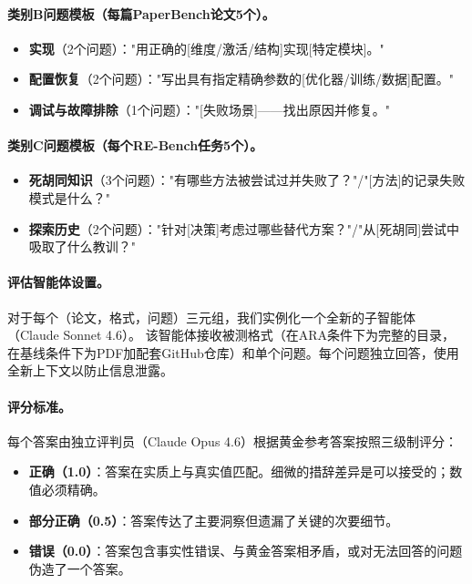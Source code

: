\paragraph{类别B问题模板（每篇PaperBench论文5个）。}
\begin{itemize}[leftmargin=*, itemsep=2pt]
    \item \textbf{实现}（2个问题）："用正确的[维度/激活/结构]实现[特定模块]。"
    \item \textbf{配置恢复}（2个问题）："写出具有指定精确参数的[优化器/训练/数据]配置。"
    \item \textbf{调试与故障排除}（1个问题）："[失败场景]——找出原因并修复。"
\end{itemize}

\paragraph{类别C问题模板（每个RE-Bench任务5个）。}
\begin{itemize}[leftmargin=*, itemsep=2pt]
    \item \textbf{死胡同知识}（3个问题）："有哪些方法被尝试过并失败了？"/"[方法]的记录失败模式是什么？"
    \item \textbf{探索历史}（2个问题）："针对[决策]考虑过哪些替代方案？"/"从[死胡同]尝试中吸取了什么教训？"
\end{itemize}

\paragraph{评估智能体设置。}
对于每个（论文，格式，问题）三元组，我们实例化一个全新的子智能体（Claude Sonnet 4.6）。
该智能体接收被测格式（在ARA条件下为完整的\ara{}目录，在基线条件下为PDF加配套GitHub仓库）和单个问题。每个问题独立回答，使用全新上下文以防止信息泄露。

\paragraph{评分标准。}
每个答案由独立评判员（Claude Opus 4.6）根据黄金参考答案按照三级制评分：
\begin{itemize}[leftmargin=*, itemsep=1pt]
    \item \textbf{正确（1.0）}：答案在实质上与真实值匹配。细微的措辞差异是可以接受的；数值必须精确。
    \item \textbf{部分正确（0.5）}：答案传达了主要洞察但遗漏了关键的次要细节。
    \item \textbf{错误（0.0）}：答案包含事实性错误、与黄金答案相矛盾，或对无法回答的问题伪造了一个答案。
\end{itemize}

